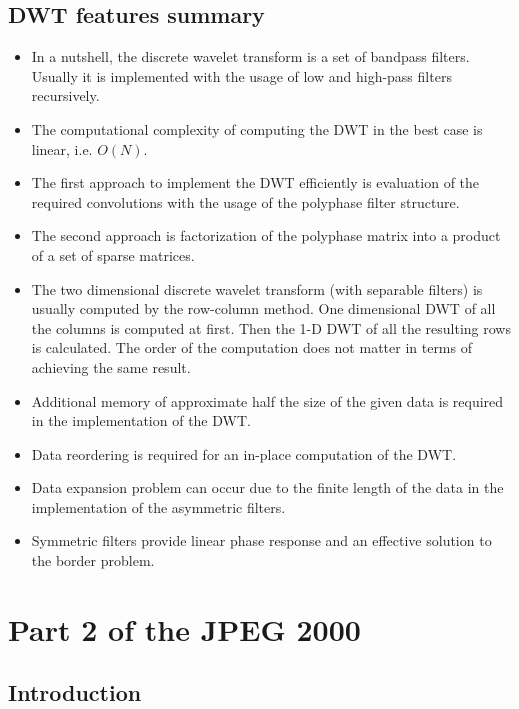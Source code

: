 \subsection{DWT features summary}

\begin{itemize}
    \item In a nutshell, the discrete wavelet transform is a set of bandpass filters. Usually it is implemented
    with the usage of low and high-pass filters recursively.
    \item The computational complexity of computing the DWT in the best case is linear, i.e. $O(N)$.
    \item The first approach to implement the DWT efficiently is evaluation of the required convolutions
    with the usage of the polyphase filter structure.
    \item The second approach is factorization of the polyphase matrix into a product of a set of sparse matrices.
    \item The two dimensional discrete wavelet transform (with separable filters) is usually computed by the row-column method.
    One dimensional DWT of all the columns is computed at first. Then the 1-D DWT of all the resulting
    rows is calculated. The order of the computation does not matter in terms of achieving the same result.
    \item Additional memory of approximate half the size of the given data is required in the implementation of the DWT.
    \item Data reordering is required for an in-place computation of the DWT.
    \item Data expansion problem can occur due to the finite length of the data in the implementation of the asymmetric filters.
    \item Symmetric filters provide linear phase response and an effective solution to the border problem. \cite{dwt_impl}
\end{itemize}

\section{Part 2 of the JPEG 2000}


\subsection{Introduction}

